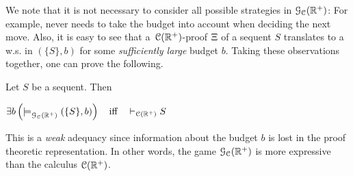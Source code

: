 We note that it is not necessary to consider all possible strategies in $\mathcal{G}_{\mathcal{C}}(\mathbb{R}^+)$: For example, \I never needs to take the budget into account when deciding the next move. Also, it is easy to see that a~$\mathcal{C}(\mathbb{R}^+)$-proof $\Xi$ of a sequent $S$ translates to a w.s. in $(\{S\},b)$ for some \textit{sufficiently large} budget $b$. Taking these observations together, one can prove the following.
\begin{theorem}
\label{theorem:wadeq}
Let $S$ be a sequent. Then

$\exists b\left(\models^{}_{\mathcal{G}_{\mathcal{C}}(\mathbb{R}^+)}(\{S\},b)\right)\quad\mbox{iff}\quad\vdash_{\mathcal{C}(\mathbb{R}^+)} S$
\end{theorem}
This is a \emph{weak} adequacy since information about the budget $b$ is lost in the proof theoretic representation. In other words, the game $\mathcal{G}_{\mathcal{C}}(\mathbb{R}^+)$ is more expressive than the calculus $\mathcal{C}(\mathbb{R}^+)$.

